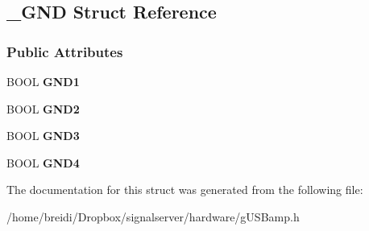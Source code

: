 \hypertarget{struct___g_n_d}{
\subsection{\_\-GND Struct Reference}
\label{struct___g_n_d}
}
\subsubsection*{Public Attributes}
\begin{DoxyCompactItemize}
\item 
\hypertarget{struct___g_n_d_ae8a97a35a1f95225984e1edb0243c31f}{
BOOL {\bfseries GND1}}
\label{struct___g_n_d_ae8a97a35a1f95225984e1edb0243c31f}

\item 
\hypertarget{struct___g_n_d_a4596e3c35520530ab772fa6ead30cd6c}{
BOOL {\bfseries GND2}}
\label{struct___g_n_d_a4596e3c35520530ab772fa6ead30cd6c}

\item 
\hypertarget{struct___g_n_d_a9090f8ffbf5e7fd2599b5623b16da431}{
BOOL {\bfseries GND3}}
\label{struct___g_n_d_a9090f8ffbf5e7fd2599b5623b16da431}

\item 
\hypertarget{struct___g_n_d_ab6162e9dc74c76689ebea8822ed3264e}{
BOOL {\bfseries GND4}}
\label{struct___g_n_d_ab6162e9dc74c76689ebea8822ed3264e}

\end{DoxyCompactItemize}


The documentation for this struct was generated from the following file:\begin{DoxyCompactItemize}
\item 
/home/breidi/Dropbox/signalserver/hardware/gUSBamp.h\end{DoxyCompactItemize}
